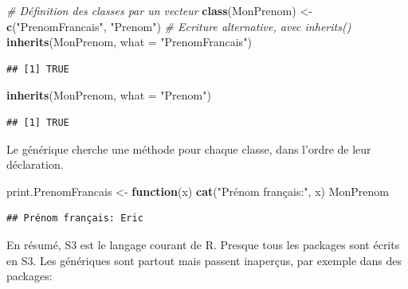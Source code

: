 \documentclass[
  12pt,
  french,
  a4paper,
  extrafontsizes,onecolumn,openright
  ]{memoir}
\newenvironment{Shaded}{\begin{snugshade}}{\end{snugshade}}
\newcommand{\CommentTok}[1]{\textcolor[rgb]{0.56,0.35,0.01}{\textit{#1}}}
\newcommand{\ControlFlowTok}[1]{\textcolor[rgb]{0.13,0.29,0.53}{\textbf{#1}}}
\newcommand{\DataTypeTok}[1]{\textcolor[rgb]{0.13,0.29,0.53}{#1}}
\newcommand{\KeywordTok}[1]{\textcolor[rgb]{0.13,0.29,0.53}{\textbf{#1}}}
\newcommand{\NormalTok}[1]{#1}
\newcommand{\StringTok}[1]{\textcolor[rgb]{0.31,0.60,0.02}{#1}}
\begin{document}
\scriptsize

\begin{Shaded}
\begin{Highlighting}[]
\CommentTok{# Définition des classes par un vecteur}
\KeywordTok{class}\NormalTok{(MonPrenom) <-}\StringTok{ }\KeywordTok{c}\NormalTok{(}\StringTok{"PrenomFrancais"}\NormalTok{, }\StringTok{"Prenom"}\NormalTok{)}
\CommentTok{# Ecriture alternative, avec inherits()}
\KeywordTok{inherits}\NormalTok{(MonPrenom, }\DataTypeTok{what =} \StringTok{"PrenomFrancais"}\NormalTok{)}
\end{Highlighting}
\end{Shaded}

\begin{verbatim}
## [1] TRUE
\end{verbatim}

\begin{Shaded}
\begin{Highlighting}[]
\KeywordTok{inherits}\NormalTok{(MonPrenom, }\DataTypeTok{what =} \StringTok{"Prenom"}\NormalTok{)}
\end{Highlighting}
\end{Shaded}

\begin{verbatim}
## [1] TRUE
\end{verbatim}

\normalsize

Le générique cherche une méthode pour chaque classe, dans l'ordre de leur déclaration.

\scriptsize

\begin{Shaded}
\begin{Highlighting}[]
\NormalTok{print.PrenomFrancais <-}\StringTok{ }\ControlFlowTok{function}\NormalTok{(x) }\KeywordTok{cat}\NormalTok{(}\StringTok{"Prénom français:"}\NormalTok{,}
\NormalTok{    x)}
\NormalTok{MonPrenom}
\end{Highlighting}
\end{Shaded}

\begin{verbatim}
## Prénom français: Eric
\end{verbatim}

\normalsize

En résumé, S3 est le langage courant de R.
Presque tous les packages sont écrits en S3.
Les génériques sont partout mais passent inaperçus, par exemple dans des packages:

\scriptsize
\end{document}
